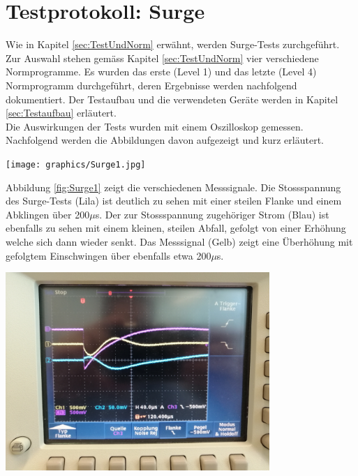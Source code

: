 \section{Testprotokoll: Surge}
\label{sec:Test:Surge}
Wie in Kapitel \ref{sec:TestUndNorm} erwähnt, werden Surge-Tests zurchgeführt. Zur Auswahl stehen gemäss Kapitel \ref{sec:TestUndNorm} vier verschiedene Normprogramme. Es wurden das erste (Level 1) und das letzte (Level 4) Normprogramm durchgeführt, deren Ergebnisse werden nachfolgend dokumentiert. Der Testaufbau und die verwendeten Geräte werden in Kapitel \ref{sec:Testaufbau} erläutert.\\[0.25cm]
Die Auswirkungen der Tests wurden mit einem Oszilloskop gemessen. Nachfolgend werden die Abbildungen davon aufgezeigt und kurz erläutert.\\[0.5cm]
\begin{minipage}[b][10cm][t]{1\textwidth}
\centering
\texttt{[image: graphics/Surge1.jpg]}
\label{fig:Surge1}
\end{minipage}
Abbildung \ref{fig:Surge1} zeigt die verschiedenen Messsignale. Die Stossspannung des Surge-Tests (Lila) ist deutlich zu sehen mit einer steilen Flanke und einem Abklingen über 200$\mu$s. Der zur Stossspannung zugehöriger Strom (Blau) ist ebenfalls zu sehen mit einem kleinen, steilen Abfall, gefolgt von einer Erhöhung welche sich dann wieder senkt. Das Messsignal (Gelb) zeigt eine Überhöhung mit gefolgtem Einschwingen über ebenfalls etwa 200$\mu$s.\\[0.5cm]
\begin{minipage}[b][10cm][t]{1\textwidth}
\centering
\includegraphics[angle=0,width=0.75\textwidth]{graphics/Surge2.jpg}
\label{fig:Surge2}
\end{minipage}
